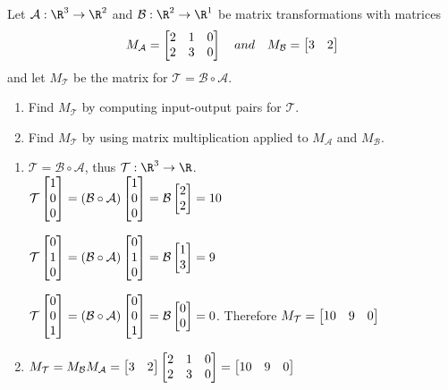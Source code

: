 \begin{exercises}
\begin{problist}
		\prob Let $\mathcal A: \R^{3}\to \R^{2}$ and $\mathcal B: \R^{2}\to \R^{1}$
		be matrix transformations with matrices
		\[
			M_{\mathcal A}= \mat{2&1&0\\2&3&0}\quad and \quad M_{\mathcal B}=
			\mat{3&2}
		\]
		 and let $M_{\mathcal T}$ be the matrix for $\mathcal T=\mathcal B\circ \mathcal
		A$.
		\begin{enumerate}
			\item Find $M_{\mathcal T}$ by computing input-output pairs for $\mathcal
				T$.

			\item Find $M_{\mathcal T}$ by using matrix multiplication applied
				to $M_{\mathcal A}$ and $M_{\mathcal B}$.
		\end{enumerate}


		\begin{solution}

			\begin{enumerate}
				\item $\mathcal T = \mathcal B \circ \mathcal A$, thus
					$\mathcal T : \R^{3}\to \R$. \\ $\mathcal T \mat{1\\0\\0}=
					(\mathcal B \circ \mathcal A) \mat{1\\0\\0}=
					\mathcal B \mat{2\\2}= 10$

					$\mathcal T \mat{0\\1\\0}= (\mathcal B \circ \mathcal
					A) \mat{0\\1\\0}= \mathcal B \mat{1\\3}= 9$

					$\mathcal T \mat{0\\0\\1}= (\mathcal B \circ \mathcal
					A) \mat{0\\0\\1}= \mathcal B \mat{0\\0}= 0$.
					Therefore $M_{\mathcal T}= \mat{10&9&0}$

				\item $M_{\mathcal T}= M_{\mathcal B}M_{\mathcal A}= \mat{3&2}\mat{2&1&0\\2&3&0}=
					\mat{10&9&0}$
			\end{enumerate}
		\end{solution}
	\end{problist}
\end{exercises}
